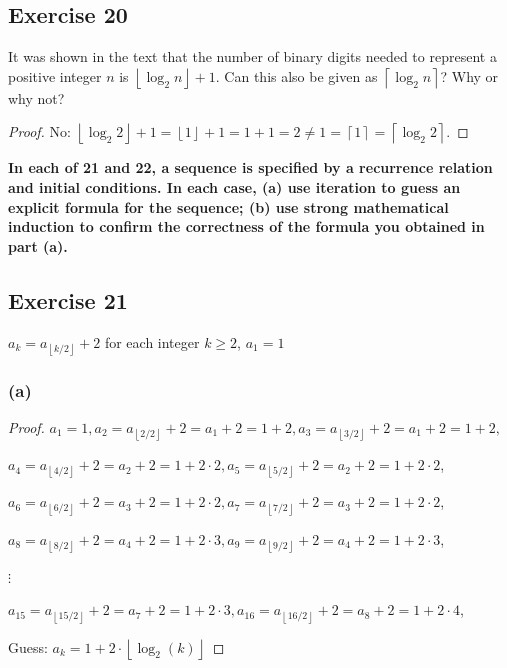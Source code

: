 \documentclass[14pt]{extarticle}
\newcommand{\cy}{\color{cyan}}
\newcommand{\floor}[1]{{\left\lfloor#1\right\rfloor}}
\newcommand{\ceil}[1]{{\left\lceil#1\right\rceil}}
\begin{document}
\subsection{Exercise 20}
It was shown in the text that the number of binary digits needed to represent a positive integer \(n\) is 
\(\floor{\log_2 n} + 1\). Can this also be given as \(\ceil{\log_2 n}\)? Why or why not?

\begin{proof}
No: \(\floor{\log_2 2} + 1 = \floor{1} + 1 = 1 + 1 = 2 \neq 1 = \ceil{1} = \ceil{\log_2 2}\).
\end{proof}

{\bf \cy In each of 21 and 22, a sequence is specified by a recurrence relation and initial conditions. In each case, (a) 
use iteration to guess an explicit formula for the sequence; (b) use strong mathematical induction to confirm the 
correctness of the formula you obtained in part (a).}

\subsection{Exercise 21}
\(a_k = a_{\floor{k/2}} + 2\) for each integer \(k \geq 2\), \(a_1 = 1\)

\subsubsection{(a)}
\begin{proof}
\(a_1 = 1, a_2 = a_{\floor{2/2}} + 2 = a_1 + 2 = 1 + 2, a_3 = a_{\floor{3/2}} + 2 = a_1 + 2 = 1 + 2,\)

\(a_4 = a_{\floor{4/2}} + 2 = a_2 + 2 = 1 + 2 \cdot 2, a_5 = a_{\floor{5/2}} + 2 = a_2 + 2 = 1 + 2 \cdot 2\),

\(a_6 = a_{\floor{6/2}} + 2 = a_3 + 2 = 1 + 2 \cdot 2, a_7 = a_{\floor{7/2}} + 2 = a_3 + 2 = 1 + 2 \cdot 2\),

\(a_8 = a_{\floor{8/2}} + 2 = a_4 + 2 = 1 + 2 \cdot 3, a_9 = a_{\floor{9/2}} + 2 = a_4 + 2 = 1 + 2 \cdot 3\),

\(\vdots\)

\(a_{15} = a_{\floor{15/2}} + 2 = a_7 + 2 = 1 + 2 \cdot 3, a_{16} = a_{\floor{16/2}} + 2 = a_8 + 2 = 1 + 2 \cdot 4\),

Guess: \(a_k = 1 + 2 \cdot \floor{\log_2(k)}\)
\end{proof}
\end{document}
